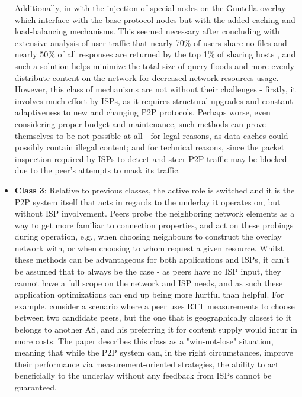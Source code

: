 \begin{itemize}
            Additionally, in \cite{freeriding-gnutella} with the injection of special nodes on the Gnutella overlay which interface with the base protocol nodes but with the added caching and load-balancing mechanisms.
            This seemed necessary after concluding with extensive analysis of user traffic that nearly 70\% of users share no files and nearly 50\% of all responses are returned by the top 1\% of sharing hosts \cite{freeriding-gnutella}, and such a solution  helps minimize the total size of query floods and more evenly distribute content on the network for decreased network resources usage.
            However, this class of mechanisms are not without their challenges - firstly, it involves much effort by ISPs, as it requires structural upgrades and constant adaptiveness to new and changing P2P protocols.
            Perhaps worse, even considering proper budget and maintenance, such methods can prove themselves to be not possible at all - for legal reasons, as data caches could possibly contain illegal content; and for technical reasons, since the packet inspection required by ISPs to detect and steer P2P traffic may be blocked due to the peer's attempts to mask its traffic.
        \item \textbf{Class 3}:
            Relative to previous classes, the active role is switched and it is the P2P system itself that acts in regards to the underlay it operates on, but without ISP involvement.
            Peers probe the neighboring network elements as a way to get more familiar to connection properties, and act on these probings during operation, e.g., when choosing neighbours to construct the overlay network with, or when choosing to whom request a given resource.
            Whilst these methods can be advantageous for both applications and ISPs, it can't be assumed that to always be the case - as peers have no ISP input, they cannot have a full scope on the network and ISP needs, and as such these application optimizations can end up being more hurtful than helpful.
            For example, consider a scenario where a peer uses RTT measurements to choose between two candidate peers, but the one that is geographically closest to it belongs to another AS, and his preferring it for content supply would incur in more costs.
            The paper describes this class as a "win-not-lose" situation, meaning that while the P2P system can, in the right circumstances, improve their performance via measurement-oriented strategies, the ability to act beneficially to the underlay without any feedback from ISPs cannot be guaranteed.

\end{itemize}
